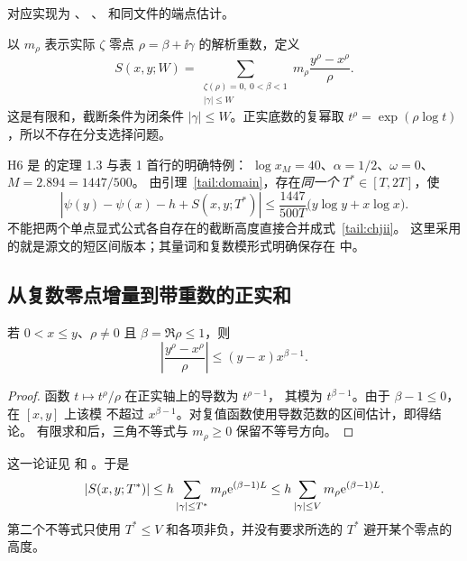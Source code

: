 对应实现为 、
、
 和同文件的端点估计。

以 $m_\rho$ 表示实际 $\zeta$ 零点 $\rho=\beta+\ii\gamma$ 的解析重数，定义
\begin{equation}\label{tail:actual-sum}
 S(x,y;W)=\sum_{\substack{\zeta(\rho)=0,\ 0<\beta<1\\|\gamma|\leq W}}
 m_\rho\frac{y^\rho-x^\rho}{\rho}.
\end{equation}
这是有限和，截断条件为闭条件 $|\gamma|\leq W$。正实底数的复幂取
$t^\rho=\exp(\rho\log t)$，所以不存在分支选择问题。

H6 是 \cite{CHJII} 的定理 1.3 与表 1 首行的明确特例：
$\log x_M=40$、$\alpha=1/2$、$\omega=0$、$M=2.894=1447/500$。
由引理~\ref{tail:domain}，存在\emph{同一个}
$T^*\in[T,2T]$，使
\begin{equation}\label{tail:chjii}
 \left|\psi(y)-\psi(x)-h+S(x,y;T^*)\right|
 \leq\frac{1447}{500T}\bigl(y\log y+x\log x\bigr).
\end{equation}
不能把两个单点显式公式各自存在的截断高度直接合并成式~\eqref{tail:chjii}。
这里采用的就是源文的短区间版本；其量词和复数模形式明确保存在
 中。

\subsection{从复数零点增量到带重数的正实和}

\begin{lemma}[复幂增量]\label{tail:cpow-increment}
若 $0<x\leq y$、$\rho\ne0$ 且 $\beta=\Re\rho\leq1$，则
\begin{equation}\label{tail:cpow-bound}
 \left|\frac{y^\rho-x^\rho}{\rho}\right|
 \leq (y-x)x^{\beta-1}.
\end{equation}
\end{lemma}

\begin{proof}
函数 $t\mapsto t^\rho/\rho$ 在正实轴上的导数为 $t^{\rho-1}$，
其模为 $t^{\beta-1}$。由于 $\beta-1\leq0$，在 $[x,y]$ 上该模
不超过 $x^{\beta-1}$。对复值函数使用导数范数的区间估计，即得结论。
有限求和后，三角不等式与 $m_\rho\geq0$ 保留不等号方向。
\end{proof}

这一论证见  和
。于是
\begin{equation}\label{tail:sum-reduction}
 |S(x,y;T^*)|
 \leq h\sum_{|\gamma|\leq T^*}m_\rho\mathrm e^{(\beta-1)L}
 \leq h\sum_{|\gamma|\leq V}m_\rho\mathrm e^{(\beta-1)L}.
\end{equation}
第二个不等式只使用 $T^*\leq V$ 和各项非负，并没有要求所选的 $T^*$
避开某个零点的高度。

